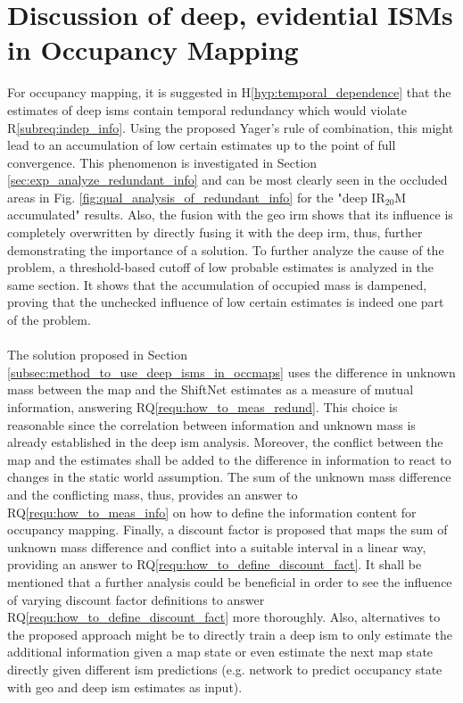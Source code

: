 \section{Discussion of deep, evidential ISMs in Occupancy Mapping}
\label{sec:disc_deep_ev_isms_in_occ_maps}
For occupancy mapping, it is suggested in H\ref{hyp:temporal_dependence} that the estimates of deep \gls{ism}s contain temporal redundancy which would violate R\ref{subreq:indep_info}. Using the proposed Yager's rule of combination, this might lead to an accumulation of low certain estimates up to the point of full convergence. This phenomenon is investigated in Section \ref{sec:exp_analyze_redundant_info} and can be most clearly seen in the occluded areas in Fig. \ref{fig:qual_analysis_of_redundant_info} for the "deep IR$_{20}$M accumulated" results. Also, the fusion with the geo \gls{irm} shows that its influence is completely overwritten by directly fusing it with the deep \gls{irm}, thus, further demonstrating the importance of a solution. To further analyze the cause of the problem, a threshold-based cutoff of low probable estimates is analyzed in the same section. It shows that the accumulation of occupied mass is dampened, proving that the unchecked influence of low certain estimates is indeed one part of the problem.
\\\\
The solution proposed in Section \ref{subsec:method_to_use_deep_isms_in_occmaps} uses the difference in unknown mass between the map and the ShiftNet estimates as a measure of mutual information, answering RQ\ref{requ:how_to_meas_redund}. This choice is reasonable since the correlation between information and unknown mass is already established in the deep \gls{ism} analysis. Moreover, the conflict between the map and the estimates shall be added to the difference in information to react to changes in the static world assumption. The sum of the unknown mass difference and the conflicting mass, thus, provides an answer to RQ\ref{requ:how_to_meas_info} on how to define the information content for occupancy mapping. Finally, a discount factor is proposed that maps the sum of unknown mass difference and conflict into a suitable interval in a linear way, providing an answer to RQ\ref{requ:how_to_define_discount_fact}. It shall be mentioned that a further analysis could be beneficial in order to see the influence of varying discount factor definitions to answer RQ\ref{requ:how_to_define_discount_fact} more thoroughly. Also, alternatives to the proposed approach might be to directly train a deep \gls{ism} to only estimate the additional information given a map state or even estimate the next map state directly given different \gls{ism} predictions (e.g. network to predict occupancy state with geo and deep \gls{ism} estimates as input).
